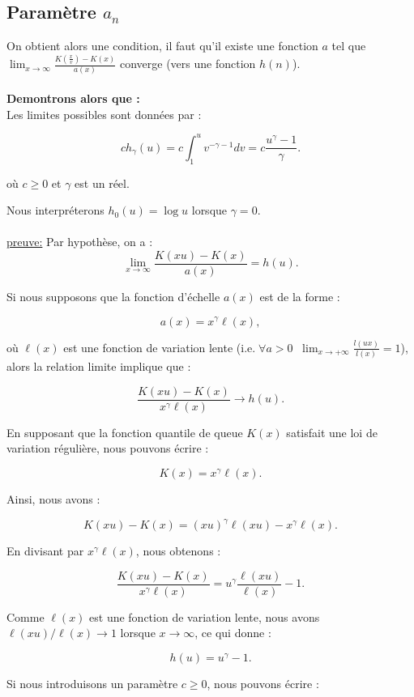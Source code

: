 \documentclass{article}
\begin{document}
\subsection{Paramètre $a_n$}
On obtient alors une condition, il faut qu'il existe une fonction $a$ tel que $\lim_{x \to \infty} \frac{K(\frac{x}{v}) - K(x)}{a(x)}$ converge (vers une fonction $h(n)$).
\\
\\
\textbf{Demontrons alors que :}
\\
Les limites possibles sont données par :

\[
ch_\gamma (u) = c \int_1^u v^{-\gamma - 1} dv = c \frac{u^\gamma - 1}{\gamma}.
\]

où \( c \geq 0 \) et \( \gamma \) est un réel.

Nous interpréterons \( h_0 (u) = \log u \) lorsque \( \gamma = 0 \).
\\
\\
\underline{preuve:}
Par hypothèse, on a :
\\
\[
\lim_{x \to \infty} \frac{K(xu) - K(x)}{a(x)} = h (u).
\]

Si nous supposons que la fonction d'échelle \( a(x) \) est de la forme :

\[
a(x) = x^\gamma \ell(x),
\]

où \( \ell(x) \) est une fonction de variation lente ($\text{i.e.} \; \forall a > 0 \; \; \lim_{x \to + \infty} \frac{l(ux)}{l(x)}=1$), alors la relation limite implique que :

\[
\frac{K(xu) - K(x)}{x^\gamma \ell(x)} \to h (u).
\]

En supposant que la fonction quantile de queue \( K(x) \) satisfait une loi de variation régulière, nous pouvons écrire :

\[
K(x) = x^\gamma \ell(x).
\]

Ainsi, nous avons :

\[
K(xu) - K(x) = (xu)^\gamma \ell(xu) - x^\gamma \ell(x).
\]

En divisant par \( x^\gamma \ell(x) \), nous obtenons :

\[
\frac{K(xu) - K(x)}{x^\gamma \ell(x)} = u^\gamma \frac{\ell(xu)}{\ell(x)} - 1.
\]

Comme \( \ell(x) \) est une fonction de variation lente, nous avons \( \ell(xu)/\ell(x) \to 1 \) lorsque \( x \to \infty \), ce qui donne :

\[
h (u) = u^\gamma - 1.
\]

Si nous introduisons un paramètre \( c \geq 0 \), nous pouvons écrire :
\end{document}
